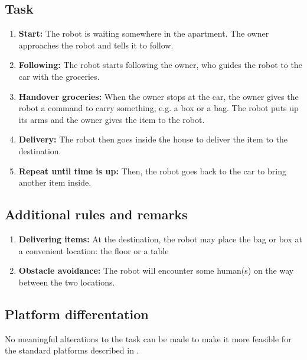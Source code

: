 \subsection{Task}
\begin{enumerate}
\item \textbf{Start:} The robot is waiting somewhere in the apartment. The owner approaches the robot and tells it to follow.
\item \textbf{Following:} The robot starts following the owner, who guides the robot to the car with the groceries. 
\item \textbf{Handover groceries:} When the owner stops at the car, the owner gives the robot a command to carry something, e.g. a box or a bag.  The robot puts up its arms and the owner gives the item to the robot.
\item \textbf{Delivery:} The robot then goes inside the house to deliver the item to the destination. 
\item \textbf{Repeat until time is up:} Then, the robot goes back to the car to bring another item inside. 
\end{enumerate}


\subsection{Additional rules and remarks}
\begin{enumerate}
  \item \textbf{Delivering items:} At the destination, the robot may place the bag or box at a convenient location: the floor or a table
  \item \textbf{Obstacle avoidance:} The robot will encounter some human(s) on the way between the two locations.  
\end{enumerate}

\subsection{Platform differentation}
No meaningful alterations to the task can be made to make it more feasible for the standard platforms described in . 

